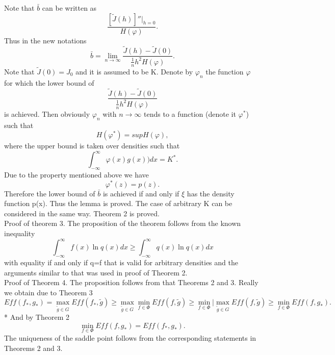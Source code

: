 \documentclass[final,11pt,3p]{elsarticle}
\begin{document}
Note that $\bar b$ can be written as
\begin{equation}
\frac{[\tilde J(h)]''|_{h=0}}{H(\varphi)}.
\end{equation}
Thus in the new notations
\begin{equation}\label{pres}
\bar b= \lim_{n \to \infty} \frac{\tilde J(h)-\tilde J(0)}{\frac{1}{n} h^2 H(\varphi)}.
\end{equation}
Note that $\tilde J(0)=J_0$ and it is assumed to be K. Denote by $\varphi_n$  the function $\varphi$ for which the lower bound of 
$$
\frac{\tilde J(h)-\tilde J(0)}{\frac{1}{n} h^2 H(\varphi)}
$$
is achieved. Then obviously  
$\varphi_n$ with $n \to \infty$ tends to a function (denote it 
$\varphi^*$) such that 
$$
H(\varphi^*)= sup H(\varphi),
$$
where the upper bound is taken over densities such that
$$
\int^\infty_{-\infty}\varphi(x) g(x)) dx=K^*.
$$
Due to the property mentioned above we have 
$$
\varphi^*(z) = p(z).
$$
Therefore the lower bound of 
$\bar b$ is achieved if and only if $\xi$ has the density function p(x). 
Thus the lemma is proved.
 The case of arbitrary K can be considered in the same way.
 Theorem 2 is proved.\\
 Proof of theorem 3. The proposition of the theorem follows from the known inequality
 $$
\int_{-\infty}^\infty f(x)\ln q(x)dx \geq 
\int_{-\infty}^\infty q(x)\ln q(x)dx 
$$
 with equality if and only if q=f that is valid for arbitrary densities and the arguments similar to that was used in proof of Theorem 2.\\
Proof of Theorem 4. The proposition follows from that Theorems 2 and 3. Really we obtain due to Theorem 3
\begin{equation}
Eff(f_{*}, g_{*})= \max_{\tilde g \in G}Eff(f_{*},\tilde g)  \geq  \max_{\tilde g \in G} \min_{f \in \Phi} Eff(f,\tilde g) \geq \min_{f \in \Phi}|\max_{\tilde g \in G}Eff(f,\tilde g) \geq \min_{f \in \Phi}Eff(f, g_{*}).
\end{equation}*
And by Theorem 2
$$
\min_{f \in \Phi}Eff(f, g_{*})=Eff(f_{*}, g_{*}).
$$
The uniqueness of the saddle point follows from the corresponding statements in Theorems 2 and 3.
 
\end{document}

